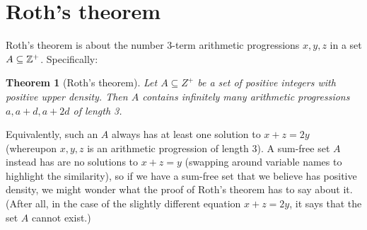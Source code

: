 \documentclass{report}
\newtheorem{theorem}{Theorem}[section]
\theoremstyle{remark}
\numberwithin{equation}{section}
\begin{document}









\section{Roth's theorem}

Roth's theorem is about the number 3-term arithmetic progressions
$x, y, z$ in a set $A \subseteq \mathbb{Z}^+$.  Specifically: 

\begin{theorem}[Roth's theorem]
  Let $A \subseteq Z^+$ be a set of positive integers with positive
  upper density.  Then $A$ contains infinitely many arithmetic
  progressions $a, a+d, a+2d$ of length 3.  
\end{theorem}

Equivalently, such an $A$ always has at least one solution to $x+z=2y$
(whereupon $x, y, z$ is an arithmetic progression of length $3$).  A
sum-free set $A$ instead has are no solutions to $x+z=y$ (swapping
around variable names to highlight the similarity), so if we have a
sum-free set that we believe has positive density, we might wonder
what the proof of Roth's theorem has to say about it.  (After all, in
the case of the slightly different equation $x+z=2y$, it says that the
set $A$ cannot exist.)
\end{document}
